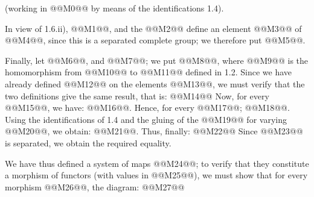 (working in @@M0@@ by means of the identifications 1.4).

In view of 1.6.ii), @@M1@@, and the @@M2@@ define an element @@M3@@ of @@M4@@, since this is a separated complete group; we therefore put @@M5@@.

Finally, let @@M6@@, and @@M7@@; we put @@M8@@, where @@M9@@ is the homomorphism from @@M10@@ to @@M11@@ defined in 1.2. Since we have already defined @@M12@@ on the elements @@M13@@, we must verify that the two definitions give the same result, that is:
@@M14@@
Now, for every @@M15@@, we have: @@M16@@. Hence, for every @@M17@@; @@M18@@. Using the identifications of 1.4 and the gluing of the @@M19@@ for varying @@M20@@, we obtain: @@M21@@.
Thus, finally:
@@M22@@
Since @@M23@@ is separated, we obtain the required equality.

We have thus defined a system of maps @@M24@@; to verify that they constitute a morphism of functors (with values in @@M25@@), we must show that for every morphism @@M26@@, the diagram:
@@M27@@
